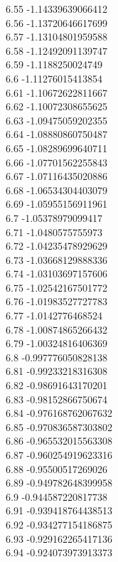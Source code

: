 {6.55	-1.14339639066412\\
6.56	-1.13720646617699\\
6.57	-1.13104801959588\\
6.58	-1.12492091139747\\
6.59	-1.1188250024749\\
6.6	-1.11276015413854\\
6.61	-1.10672622811667\\
6.62	-1.10072308655625\\
6.63	-1.09475059202355\\
6.64	-1.08880860750487\\
6.65	-1.08289699640711\\
6.66	-1.07701562255843\\
6.67	-1.07116435020886\\
6.68	-1.06534304403079\\
6.69	-1.05955156911961\\
6.7	-1.05378979099417\\
6.71	-1.0480575755973\\
6.72	-1.04235478929629\\
6.73	-1.03668129888336\\
6.74	-1.03103697157606\\
6.75	-1.02542167501772\\
6.76	-1.01983527727783\\
6.77	-1.0142776468524\\
6.78	-1.00874865266432\\
6.79	-1.00324816406369\\
6.8	-0.997776050828138\\
6.81	-0.99233218316308\\
6.82	-0.98691643170201\\
6.83	-0.98152866750674\\
6.84	-0.976168762067632\\
6.85	-0.970836587303802\\
6.86	-0.965532015563308\\
6.87	-0.960254919623316\\
6.88	-0.95500517269026\\
6.89	-0.949782648399958\\
6.9	-0.944587220817738\\
6.91	-0.939418764438513\\
6.92	-0.934277154186875\\
6.93	-0.929162265417136\\
6.94	-0.924073973913373\\
}
